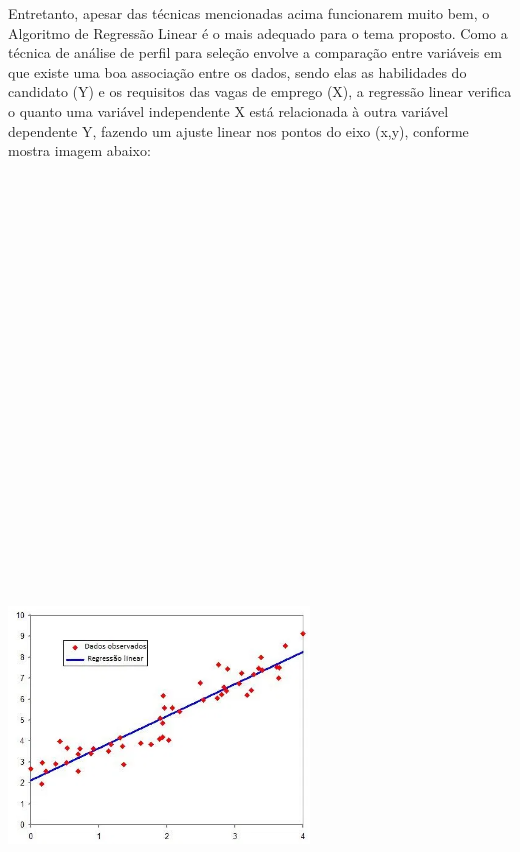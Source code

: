 \documentclass[conference]{IEEEtran}
\begin{document}
Entretanto, apesar das técnicas mencionadas acima funcionarem muito bem, o Algoritmo de Regressão Linear é o mais adequado para o tema proposto. Como a técnica de análise de perfil para seleção envolve a comparação entre variáveis em que existe uma boa associação entre os dados, sendo elas as habilidades do candidato (Y) e os requisitos das vagas de emprego (X), a regressão linear verifica o quanto uma variável independente X está relacionada à outra variável dependente Y, fazendo um ajuste linear nos pontos do eixo (x,y), conforme mostra imagem abaixo:

\vspace{7mm}
\centerline{\includegraphics[width=80mm,height=600mm,keepaspectratio]{ExRegressaoLinear.png}}
\vspace{7mm}
\end{document}
